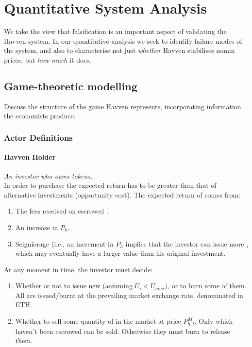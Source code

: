 \section{Quantitative System Analysis}

We take the view that falsification is an important aspect of validating
the Havven system. In our quantitative analysis we seek to identify failure modes
of the system, and also to characterise not just \textit{whether} Havven stabilises
nomin prices, but \textit{how much} it does.

\subsection{Game-theoretic modelling}
Discuss the structure of the game Havven represents, incorporating information the economists produce.

\subsubsection{Actor Definitions}
\paragraph{Havven Holder}
\emph{An investor who owns \HAV{} tokens.} \\

\noindent In order to purchase \HAV{} the expected return has to be greater than that of alternative investments (opportunity cost). The expected return of \HAV{} comes from:
\begin{enumerate}
\item{The fees received on escrowed \HAV{}.}
\item{An increase in $P_h$.}
\item{Seigniorage (i.e., an increment in $P_h$ implies that the investor can issue more \NOM{}, which may eventually have a larger value than his original investment.}
\end{enumerate}

\noindent At any moment in time, the investor must decide:
\begin{enumerate}
\item{Whether or not to issue new \NOM{} (assuming $U_i < U_{max}$), or to burn some of them. All \NOM{} are issued/burnt at the prevailing market exchange rate, denominated in ETH.}
\item{Whether to sell some quantity of \HAV{} in the market at price $P^M_{h,t}$. Only \HAV{} which haven't been escrowed can be sold. Otherwise they must burn \NOM{} to release them. }
\end{enumerate}


